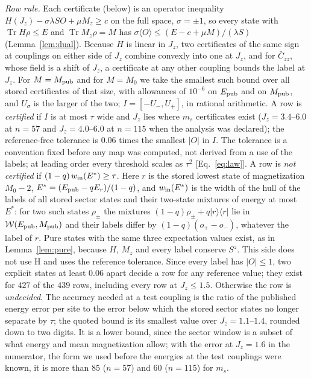\documentclass[aps,prx,twocolumn,10pt,superscriptaddress,nofootinbib,longbibliography,floatfix]{revtex4-2}
\theoremstyle{remark}
\newcommand{\Jz}{J_z}
\newcommand{\ms}{m_s}
\newcommand{\Czz}{\bar C_{zz}}
\newcommand{\W}{\mathcal{W}}
\newcommand{\Tr}{\operatorname{Tr}}
\begin{document}
\emph{Row rule.} Each certificate (below) is an operator inequality $H(\Jz)-\sigma\lambda SO+\mu M_z\ge c$ on the full
space, $\sigma=\pm1$, so every state with $\Tr H\rho\le E$ and $\Tr M_z\rho=M$ has
$\sigma\langle O\rangle\le(E-c+\mu M)/(\lambda S)$ (Lemma~\ref{lem:dual}). Because $H$ is linear in $\Jz$, two
certificates of the same sign at couplings on either side of $\Jz$ combine convexly into one at $\Jz$, and for
$\Czz$, whose field is a shift of $\Jz$, a certificate at any other coupling bounds the label at $\Jz$. For
$M=M_{\rm pub}$ and for $M=M_0$ we take the smallest such bound over all stored certificates of that size, with
allowances of $10^{-6}$ on $E_{\rm pub}$ and on $M_{\rm pub}$, and $U_\sigma$ is the larger of the two; %
$I=[-U_-,U_+]$, in rational arithmetic. A row is \emph{certified} if $I$ is at most $\tau$ wide and $\Jz$ lies
where $\ms$ certificates exist ($\Jz=3.4$--$6.0$ at $n=57$ and $\Jz=4.0$--$6.0$ at $n=115$ when the analysis was %
declared); the reference-free tolerance is $0.06$ times the smallest $|O|$ in $I$. The tolerance is a convention %
fixed before any map was computed, not derived from a use of the labels; at leading order every threshold scales
as $\tau^2$ [Eq.~\eqref{eq:law}]. A row is \emph{not certified} if $(1-q)\,w_{\rm in}(E^*)\ge\tau$. Here
$r$ is the stored lowest state of magnetization $M_0-2$,
$E^*=(E_{\rm pub}-qE_r)/(1-q)$, and $w_{\rm in}(E^*)$ is the width of the hull of the labels of all stored sector
states and their two-state mixtures of energy at most $E^*$: for two such states $\rho_\pm$ the mixtures
$(1-q)\rho_\pm+q|r\rangle\langle r|$ lie in $\W(E_{\rm pub},M_{\rm pub})$ and their labels differ by $(1-q)(o_+-o_-)$,
whatever the label of $r$. Pure states with the same three expectation values exist, as in
Lemma~\ref{lem:pure}, because $H$, $M_z$ and every label conserve $S^z$. This side does not use H and uses the
reference tolerance. Since every label has $|O|\le1$, two explicit states at least $0.06$ apart decide a row for any %
reference value; they exist for $427$ of the $439$ rows, including every row at $\Jz\le1.5$. Otherwise the row is %
\emph{undecided}. The
accuracy needed at a test coupling is the ratio of the published energy error per site to the error below which
the stored sector states no longer separate by $\tau$; the quoted bound is its smallest value over
$\Jz=1.1$--$1.4$, rounded down to two digits. It is a lower bound, since the sector window is a subset of what
energy and mean magnetization allow; with the error at $\Jz=1.6$ in the numerator, the form we used before the
energies at the test couplings were known, it is more than $85$ ($n=57$) and $60$ ($n=115$) for $\ms$. %
\end{document}
